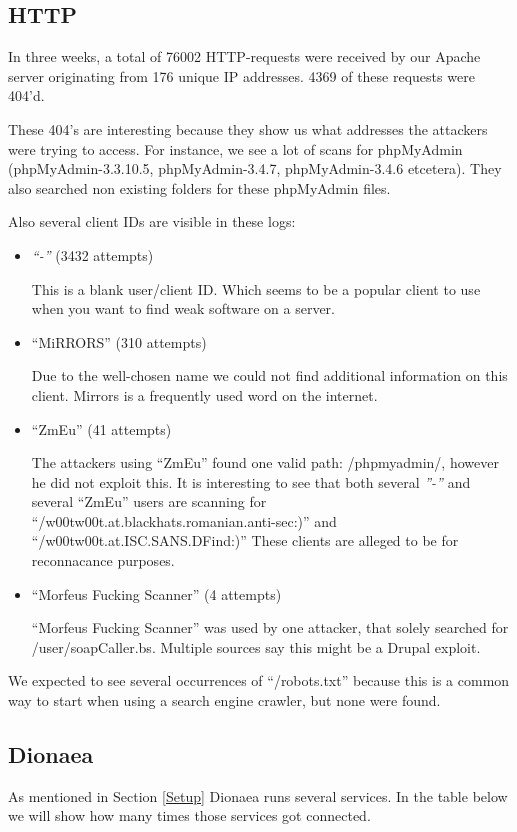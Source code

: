 \documentclass[11pt]{article}
\begin{document}
\subsection{HTTP}
In three weeks, a total of 76002 HTTP-requests were received by our Apache server originating from 176 unique IP addresses. 4369 of these requests were 404'd.

These 404's are interesting because they show us what addresses the attackers were trying to access. For instance, we see a lot of scans for phpMyAdmin (phpMyAdmin-3.3.10.5, phpMyAdmin-3.4.7, phpMyAdmin-3.4.6 etcetera). They also searched non existing folders for these phpMyAdmin files. 

Also several client IDs are visible in these logs: 

\begin{itemize}
\item \emph{``-''} (3432 attempts)

This is a blank user/client ID. Which seems to be a popular client to use when you want to find weak software on a server.

\item ``MiRRORS'' (310 attempts)

Due to the well-chosen name we could not find additional information on this client. Mirrors is a frequently used word on the internet.

\item ``ZmEu'' (41 attempts)

The attackers using ``ZmEu'' found one valid path: /phpmyadmin/, however he did not exploit this. 
It is interesting to see that both several \emph{''-''} and several ``ZmEu'' users are scanning for ``/w00tw00t.at.blackhats.romanian.anti-sec:)'' and ``/w00tw00t.at.ISC.SANS.DFind:)'' These clients are alleged to be for reconnacance purposes.

\item ``Morfeus Fucking Scanner'' (4 attempts)

``Morfeus Fucking Scanner'' was used by one attacker, that solely searched for /user/soapCaller.bs. Multiple sources say this might be a Drupal exploit.
\end{itemize}

We expected to see several occurrences of ``/robots.txt'' because this is a common way to start when using a search engine crawler, but none were found.

\subsection{Dionaea}
As mentioned in Section \ref{Setup} Dionaea runs several services. In the table below we will show how many times those services got connected.
\end{document}
